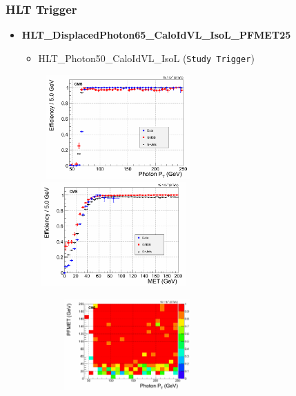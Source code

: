 \documentclass{beamer}
\begin{document}
 \begin{frame}
 \frametitle{\huge{HLT Trigger}}
  \begin{minipage}[b]{\linewidth}
    \begin{itemize}
     \item \textbf{HLT\_DisplacedPhoton65\_CaloIdVL\_IsoL\_PFMET25}%
     \begin{itemize}
        \item  HLT\_Photon50\_CaloIdVL\_IsoL (\texttt{Study Trigger})
     \end{itemize}
   \end{itemize}  
  \end{minipage}
  
  
 \vspace{-0.2cm}
 \begin{minipage}[b]{0.7\paperwidth}
\flushleft
    \begin{figure}[htbp]
 \mbox{
   \includegraphics[height=4.0cm,width=0.55\textwidth]{THESISPLOTS/Photon_EffAsym.png}
   \includegraphics[height=4.0cm,width=0.55\textwidth]{THESISPLOTS/PFMET_EffAsym.png} }
   \end{figure}    
\end{minipage}  
\centering
\includegraphics[height=3.5cm,width=0.70\textwidth]{THESISPLOTS/Eff2D.png} 
  
  
\end{frame}
\end{document}
